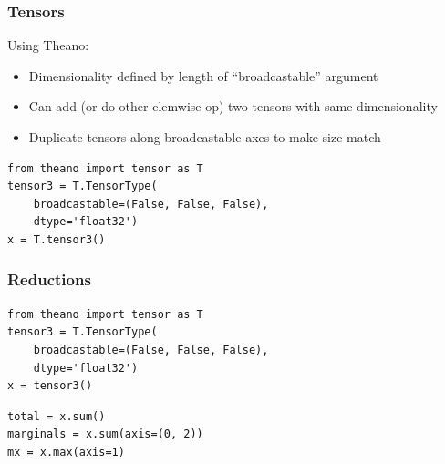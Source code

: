 \documentclass[utf8x,xcolor=pdftex,dvipsnames,table]{beamer}
\begin{document}
\begin{frame}[fragile]
  \frametitle{Tensors}
  Using Theano:
  \begin{itemize}
  \item Dimensionality defined by length of ``broadcastable'' argument
  \item Can add (or do other elemwise op) two
    tensors with same dimensionality
  \item Duplicate tensors along broadcastable axes to make size match
  \end{itemize}
\begin{lstlisting}
from theano import tensor as T
tensor3 = T.TensorType(
    broadcastable=(False, False, False),
    dtype='float32')
x = T.tensor3()
\end{lstlisting}
\end{frame}

\begin{frame}[fragile]
  \frametitle{Reductions}
\begin{lstlisting}
from theano import tensor as T
tensor3 = T.TensorType(
    broadcastable=(False, False, False),
    dtype='float32')
x = tensor3()
\end{lstlisting}

\begin{lstlisting}
total = x.sum()
marginals = x.sum(axis=(0, 2))
mx = x.max(axis=1)
\end{lstlisting}
\end{frame}
\end{document}

